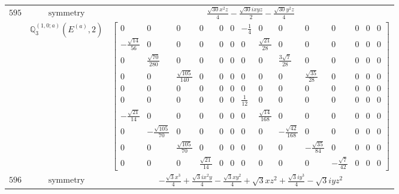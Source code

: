 \documentclass[fleqn,8pt,landscape]{jsarticle}
\begin{document}
\begin{longtable}{ccc}
$ 595 $ & $ \text{symmetry} $ & $ \frac{\sqrt{30} x^{2} z}{4} - \frac{\sqrt{30} i x y z}{2} - \frac{\sqrt{30} y^{2} z}{4} $ \\
$  $ & $ \mathbb{Q}_{3}^{(1,0;a)}(E^{(a)},2) $ & $ \begin{bmatrix} 0 & 0 & 0 & 0 & 0 & 0 & - \frac{1}{4} & 0 & 0 & 0 & 0 & 0 & 0 & 0 \\ - \frac{\sqrt{14}}{56} & 0 & 0 & 0 & 0 & 0 & 0 & \frac{\sqrt{21}}{28} & 0 & 0 & 0 & 0 & 0 & 0 \\ 0 & \frac{\sqrt{70}}{280} & 0 & 0 & 0 & 0 & 0 & 0 & \frac{3 \sqrt{7}}{28} & 0 & 0 & 0 & 0 & 0 \\ 0 & 0 & \frac{\sqrt{105}}{140} & 0 & 0 & 0 & 0 & 0 & 0 & \frac{\sqrt{35}}{28} & 0 & 0 & 0 & 0 \\ 0 & 0 & 0 & 0 & 0 & 0 & 0 & 0 & 0 & 0 & 0 & 0 & 0 & 0 \\ 0 & 0 & 0 & 0 & 0 & 0 & \frac{1}{12} & 0 & 0 & 0 & 0 & 0 & 0 & 0 \\ - \frac{\sqrt{21}}{14} & 0 & 0 & 0 & 0 & 0 & 0 & \frac{\sqrt{14}}{168} & 0 & 0 & 0 & 0 & 0 & 0 \\ 0 & - \frac{\sqrt{105}}{70} & 0 & 0 & 0 & 0 & 0 & 0 & - \frac{\sqrt{42}}{168} & 0 & 0 & 0 & 0 & 0 \\ 0 & 0 & \frac{\sqrt{105}}{70} & 0 & 0 & 0 & 0 & 0 & 0 & - \frac{\sqrt{35}}{84} & 0 & 0 & 0 & 0 \\ 0 & 0 & 0 & \frac{\sqrt{21}}{14} & 0 & 0 & 0 & 0 & 0 & 0 & - \frac{\sqrt{7}}{42} & 0 & 0 & 0 \end{bmatrix} $ \\ \hline
$ 596 $ & $ \text{symmetry} $ & $ - \frac{\sqrt{3} x^{3}}{4} + \frac{\sqrt{3} i x^{2} y}{4} - \frac{\sqrt{3} x y^{2}}{4} + \sqrt{3} x z^{2} + \frac{\sqrt{3} i y^{3}}{4} - \sqrt{3} i y z^{2} $ \\

\end{longtable}
\end{document}

